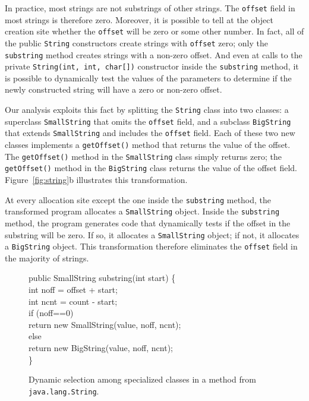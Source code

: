 \documentclass[oribibl]{llncs}
\begin{document}
In practice, most strings are not substrings of other strings. 
The {\tt offset} field in most strings is therefore zero.
Moreover, it is possible to tell at the object creation site
whether the {\tt offset} will be zero or some other number.
In fact, all of the public {\tt String} constructors create
strings with {\tt offset} zero; only the {\tt substring} method
creates strings with a non-zero offset. And even at 
calls to the private {\tt String(int, int, char[])} constructor
inside the {\tt substring} method, it is possible to dynamically
test the values of the parameters to determine if the newly
constructed string will have a zero or non-zero offset.

Our analysis exploits this fact by splitting the 
{\tt String} class into two classes: a superclass {\tt SmallString}
that omits the {\tt offset} field, and a subclass {\tt BigString} that
extends {\tt SmallString} and includes the {\tt offset} field. 
Each of these two new classes implements a {\tt getOffset()} method
that returns the value of the offset. The {\tt getOffset()} method
in the {\tt SmallString} class simply returns zero; the {\tt
getOffset()} method in the {\tt BigString} class returns the 
value of the offset field.  Figure~\ref{fig:string}b illustrates
this transformation.

At every allocation site except the one inside the {\tt substring}
method, the transformed program allocates a {\tt SmallString} 
object. Inside the {\tt substring} method, the program generates
code that dynamically tests if the offset in the substring
will be zero. If so, it allocates a {\tt SmallString} object;
if not, it allocates a {\tt BigString} object. This transformation
therefore eliminates the {\tt offset} field in the majority
of strings. 
%
\begin{figure}[tp]
\small\renewcommand{\baselinestretch}{0.5}\begin{samplecode}
public SmallString substring(int start) \{\\
\>int noff = offset + start;\\
\>int ncnt = count - start;\\
\>if (noff==0)\\
\>\>return new SmallString(value, noff, ncnt);\\
\>else\\
\>\>return new BigString(value, noff, ncnt);\\
\}\\
\end{samplecode}
\caption{Dynamic selection among specialized classes in a method
  from {\tt java.lang.String}.}
\label{fig:dyn-select}
\end{figure}
\end{document}
